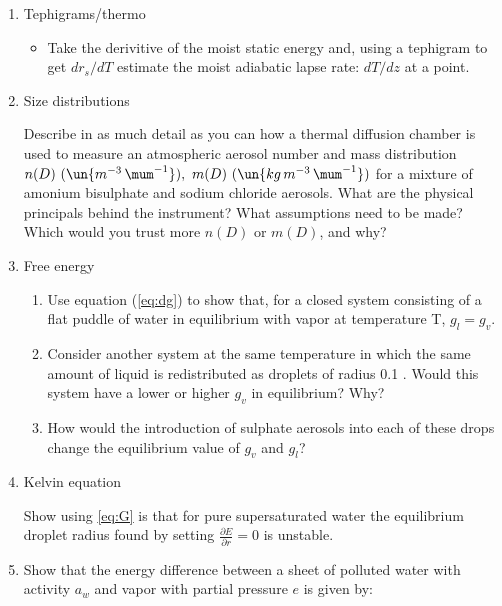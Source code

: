 \documentclass[12pt]{article}
\begin{document}
\noindent

\begin{enumerate}


\item Tephigrams/thermo

  \begin{itemize}
  \item Take the derivitive of the moist static energy and, using a tephigram
  to get $dr_s/dT$
  estimate the moist adiabatic lapse rate:  $dT/dz$ at a point.


  \end{itemize}



\item  Size distributions

\par

Describe in as much detail as you can how a thermal diffusion
chamber is used to measure an atmospheric aerosol number and mass
distribution $n(D)\ (\un{m^{-3}\,\mum^{-1}}),\ m(D)\
(\un{kg\,m^{-3}\,\mum^{-1}})$ for a mixture of amonium bisulphate and
sodium chloride aerosols.  What are the physical principals
behind the instrument?  What assumptions need to be made?  Which would
you trust more $n(D)$ or $m(D)$, and why?



\item  Free energy

  \begin{enumerate}
  \item Use equation (\ref{eq:dg}) to show that, for a closed system consisting of a
flat puddle of water in equilibrium with vapor at temperature T, $g_l = g_v$.
\item Consider another system at the same temperature in which the same amount of liquid is
  redistributed as droplets of radius 0.1 \mum.  Would this system have
  a lower or higher $g_v$ in equilibrium?  Why?
\item How would the introduction of sulphate aerosols into each of these drops
change the equilibrium value of $g_v$ and $g_l$?
  \end{enumerate}


\item Kelvin equation

Show using \ref{eq:G} is that for pure supersaturated water
the equilibrium droplet radius found by setting
$\frac{\partial E }{\partial r} = 0$ is unstable.


\item Show that the energy difference between a sheet of polluted
water with activity $a_w$ and vapor with partial pressure
$e$ is given by:


\end{enumerate}
\end{document}
